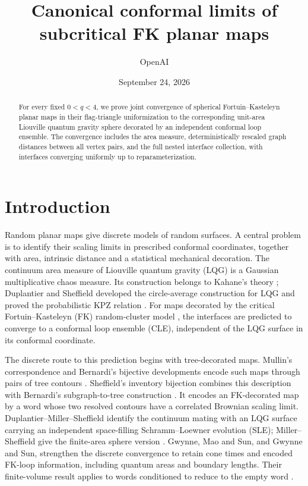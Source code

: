 \documentclass[11pt]{article}
\title{Canonical conformal limits of subcritical FK planar maps}
\author{OpenAI}
\date{September 24, 2026}
\numberwithin{equation}{section}
\theoremstyle{definition}
\theoremstyle{remark}
\newcommand{\1}{\mathbf 1}
\begin{document}
\maketitle
\begin{abstract}
For every fixed $0<q<4$, we prove joint convergence of spherical
Fortuin--Kasteleyn planar maps in their flag-triangle uniformization to
the corresponding unit-area Liouville quantum gravity sphere decorated
by an independent conformal loop ensemble. The convergence includes
the area measure, deterministically rescaled graph distances between all
vertex pairs, and the full nested interface collection, with interfaces
converging uniformly up to reparameterization.
\end{abstract}
\tableofcontents
\section{Introduction}\label{intro:section}

Random planar maps give discrete models of random surfaces. A central
problem is to identify their scaling limits in prescribed conformal
coordinates, together with area, intrinsic distance and a statistical
mechanical decoration. The continuum area measure of Liouville quantum
gravity (LQG) is a Gaussian multiplicative chaos measure. Its construction
belongs to Kahane's theory \citep{KahaneChaos1985}; Duplantier and
Sheffield developed the circle-average construction for LQG and proved
the probabilistic KPZ relation \citep{DuplantierSheffieldKPZ2011}.
For maps decorated by the critical Fortuin--Kasteleyn (FK)
random-cluster model \citep{FortuinKasteleyn1972}, the interfaces are
predicted to converge to a conformal loop ensemble (CLE), independent
of the LQG surface in its conformal coordinate.

The discrete route to this prediction begins with tree-decorated maps.
Mullin's correspondence and Bernardi's bijective developments encode
such maps through pairs of tree contours
\citep{Mullin1967,Bernardi2007}. Sheffield's inventory bijection combines
this description with Bernardi's subgraph-to-tree construction
\citep{Bernardi2008Subgraphs,SheffieldInventory}. It encodes an
FK-decorated map by a word whose two resolved contours have a correlated
Brownian scaling limit. Duplantier--Miller--Sheffield identify the
continuum mating with an LQG surface carrying an independent
space-filling Schramm--Loewner evolution (SLE); Miller--Sheffield give
the finite-area sphere version \citep{DMSMating,MillerSheffieldSphere}.
Gwynne, Mao and Sun, and Gwynne and Sun, strengthen the discrete
convergence to retain cone times and encoded FK-loop information,
including quantum areas and boundary lengths. Their finite-volume
result applies to words conditioned to reduce to the empty word
\citep{GwynneMaoSunFKI,GwynneSunFKII,GwynneSunFKIII}.
\end{document}
